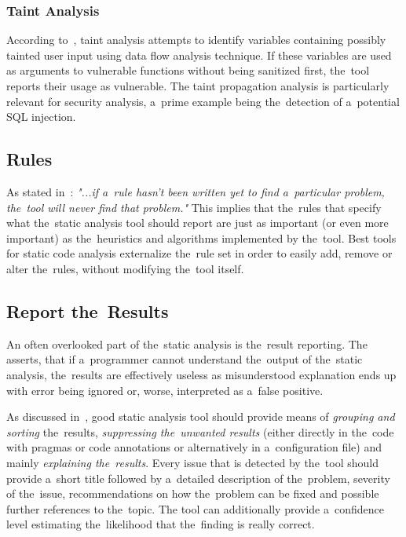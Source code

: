 \documentclass[
  digital, %
  table,   %
  lof,     %
  lot,     %
  oneside,
]{fithesis3}
\begin{document}
\subsubsection{\textbf{Taint Analysis}}
According to~\cite{oswap-sca}, taint analysis attempts to identify variables containing possibly tainted user input using data flow analysis technique. If these variables are used as arguments to vulnerable functions without being sanitized first, the~tool reports their usage as vulnerable. The taint propagation analysis is particularly relevant for security analysis, a~prime example being the~detection of a~potential SQL injection.

\subsection{Rules}
As stated in~\cite{sca-for-security}: \textit{"...if a~rule hasn’t been written yet to find a~particular problem, the~tool will never find that problem."} This implies that the~rules that specify what the~static analysis tool should report are just as important (or even more important) as the~heuristics and algorithms implemented by the~tool. Best tools for static code analysis externalize the~rule set in order to easily add, remove or alter the~rules, without modifying the~tool itself.

\subsection{Report the~Results}
An often overlooked part of the~static analysis is the~result reporting. The~\cite{coverity-sca} asserts, that if a~programmer cannot understand the~output of the~static analysis, the~results are effectively useless as misunderstood explanation ends up with error being ignored or, worse, interpreted as a~false positive.

As discussed in~\cite{security-programming-sca}, good static analysis tool should provide means of \textit{grouping and sorting} the~results, \textit{suppressing the~unwanted results} (either directly in the~code with pragmas or code annotations or alternatively in a~configuration file) and mainly \textit{explaining the~results}. Every issue that is detected by the~tool should provide a~short title followed by a~detailed description of the~problem, severity of the~issue, recommendations on how the~problem can be fixed and possible further references to the~topic. The tool can additionally provide a~confidence level estimating the~likelihood that the~finding is really correct.
\end{document}

